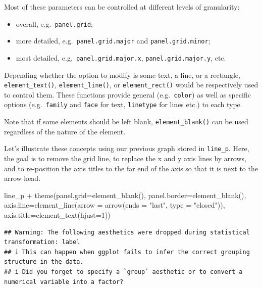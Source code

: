 \documentclass[
]{krantz}
\makeatletter
\newenvironment{Shaded}{\begin{snugshade}}{\end{snugshade}}
\newcommand{\AttributeTok}[1]{\textcolor[rgb]{0.61,0.61,0.61}{#1}}
\newcommand{\DecValTok}[1]{\textcolor[rgb]{0.06,0.06,0.06}{#1}}
\newcommand{\FunctionTok}[1]{\textcolor[rgb]{0,0,0}{#1}}
\newcommand{\NormalTok}[1]{#1}
\newcommand{\SpecialCharTok}[1]{\textcolor[rgb]{0,0,0}{#1}}
\newcommand{\StringTok}[1]{\textcolor[rgb]{0.5,0.5,0.5}{#1}}
\providecommand{\tightlist}{%
  \setlength{\itemsep}{0pt}\setlength{\parskip}{0pt}}
\newenvironment{kframe}{%
\medskip{}
\setlength{\fboxsep}{.8em}
 \def\at@end@of@kframe{}%
 \ifinner\ifhmode%
  \def\at@end@of@kframe{\end{minipage}}%
  \begin{minipage}{\columnwidth}%
 \fi\fi%
 \def\FrameCommand##1{\hskip\@totalleftmargin \hskip-\fboxsep
 \colorbox{shadecolor}{##1}\hskip-\fboxsep
     \hskip-\linewidth \hskip-\@totalleftmargin \hskip\columnwidth}%
 \MakeFramed {\advance\hsize-\width
   \@totalleftmargin\z@ \linewidth\hsize
   \@setminipage}}%
 {\par\unskip\endMakeFramed%
 \at@end@of@kframe}
\renewenvironment{Shaded}{\begin{kframe}}{\end{kframe}}
\makeatother
\begin{document}
Most of these parameters can be controlled at different levels of granularity:

\begin{itemize}
\tightlist
\item
  overall, e.g.~\texttt{panel.grid};
\item
  more detailed, e.g.~\texttt{panel.grid.major} and \texttt{panel.grid.minor};
\item
  most detailed, e.g.~\texttt{panel.grid.major.x}, \texttt{panel.grid.major.y}, etc.
\end{itemize}

Depending whether the option to modify is some text, a line, or a rectangle, \texttt{element\_text()}, \texttt{element\_line()}, or \texttt{element\_rect()} would be respectively used to control them. These functions provide general (e.g.~\texttt{color}) as well as specific options (e.g.~\texttt{family} and \texttt{face} for text, \texttt{linetype} for lines etc.) to each type.

Note that if some elements should be left blank, \texttt{element\_blank()} can be used regardless of the nature of the element.

Let's illustrate these concepts using our previous graph stored in \texttt{line\_p}. Here, the goal is to remove the grid line, to replace the x and y axis lines by arrows, and to re-position the axis titles to the far end of the axis so that it is next to the arrow head.

\begin{Shaded}
\begin{Highlighting}[]
\NormalTok{line\_p }\SpecialCharTok{+}
  \FunctionTok{theme}\NormalTok{(}\AttributeTok{panel.grid=}\FunctionTok{element\_blank}\NormalTok{(), }
        \AttributeTok{panel.border=}\FunctionTok{element\_blank}\NormalTok{(),}
        \AttributeTok{axis.line=}\FunctionTok{element\_line}\NormalTok{(}\AttributeTok{arrow =} \FunctionTok{arrow}\NormalTok{(}\AttributeTok{ends =} \StringTok{"last"}\NormalTok{, }
                                             \AttributeTok{type =} \StringTok{"closed"}\NormalTok{)),}
        \AttributeTok{axis.title=}\FunctionTok{element\_text}\NormalTok{(}\AttributeTok{hjust=}\DecValTok{1}\NormalTok{))}
\end{Highlighting}
\end{Shaded}

\begin{verbatim}
## Warning: The following aesthetics were dropped during statistical transformation: label
## i This can happen when ggplot fails to infer the correct grouping structure in the data.
## i Did you forget to specify a `group` aesthetic or to convert a numerical variable into a factor?
\end{verbatim}
\end{document}
